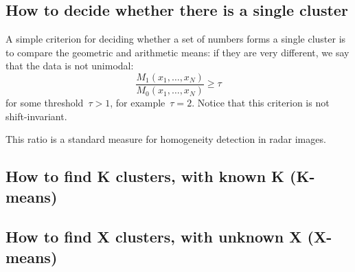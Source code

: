 \subsection{How to decide whether there is a single cluster}

A simple criterion for deciding whether a set of numbers forms a
single cluster is to compare the geometric and arithmetic means: if
they are very different, we say that the data is not unimodal:
\[
	\frac{M_1(x_1,\ldots,x_N)}{M_0(x_1,\ldots,x_N)} \ge \tau
\]
for some threshold~$\tau>1$, for example~$\tau=2$.  Notice that this
criterion is not shift-invariant.

This ratio is a standard measure for homogeneity detection in radar
images.

\subsection{How to find K clusters, with known K (K-means)}

\subsection{How to find X clusters, with unknown X (X-means)}




